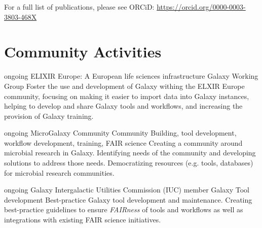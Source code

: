 \documentclass[]{shiltemann-cv}
\begin{document}






For a full list of publications, please see ORCiD: \url{https://orcid.org/0000-0003-3803-468X}

\section{Community Activities}
\begin{entrylist}

\entry
  {ongoing}
  {ELIXIR Europe: A European life sciences infrastructure}
  {Galaxy Working Group}
  {Foster the use and development of Galaxy withing the ELXIR Europe community, focusing on making it easier to import data into Galaxy instances, helping to develop and share Galaxy tools and workflows, and increasing the provision of Galaxy training.}
\end{entrylist}

\begin{entrylist}
\entry
  {ongoing}
  {MicroGalaxy Community}
  {Community Building, tool development, workflow development, training, FAIR science }
  {Creating a community around microbial research in Galaxy. Identifying needs of the community and developing solutions to address those needs. Democratizing resources (e.g. tools, databases) for microbial research communities.}

\end{entrylist}
\begin{entrylist}

\entry
  {ongoing}
  {Galaxy Intergalactic Utilities Commission (IUC) member}
  {Galaxy Tool development}
  {Best-practice Galaxy tool development and maintenance. Creating best-practice guidelines to ensure \emph{FAIRness} of tools and workflows as well as integrations with existing FAIR science initiatives.}

\end{entrylist}
\end{document}
